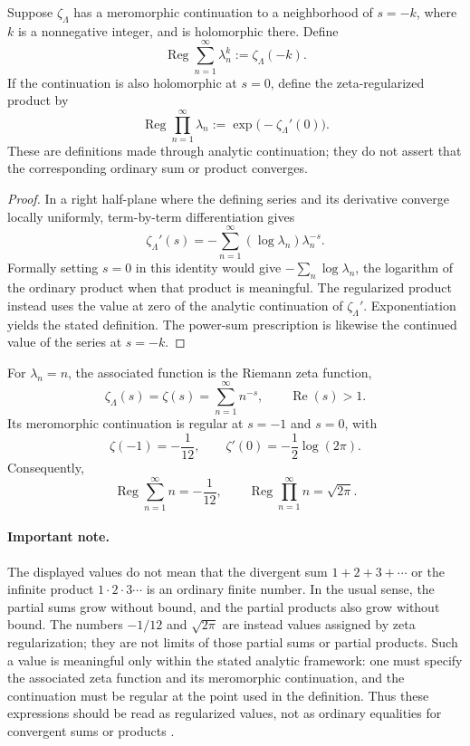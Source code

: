 \begin{theorem}
Suppose $\zeta_\Lambda$ has a meromorphic continuation to a neighborhood of $s=-k$, where $k$ is a nonnegative integer, and is holomorphic there. Define
\[
 \operatorname{Reg}\sum_{n=1}^{\infty}\lambda_n^k:=\zeta_\Lambda(-k).
\]
If the continuation is also holomorphic at $s=0$, define the zeta-regularized product by
\[
 \operatorname{Reg}\prod_{n=1}^{\infty}\lambda_n
 :=\exp\!\bigl(-\zeta_\Lambda'(0)\bigr).
\]
These are definitions made through analytic continuation; they do not assert that the corresponding ordinary sum or product converges.
\end{theorem}

\begin{proof}
In a right half-plane where the defining series and its derivative converge locally uniformly, term-by-term differentiation gives
\[
 \zeta_\Lambda'(s)
 =-\sum_{n=1}^{\infty}(\log\lambda_n)\lambda_n^{-s}.
\]
Formally setting $s=0$ in this identity would give $-\sum_n\log\lambda_n$, the logarithm of the ordinary product when that product is meaningful. The regularized product instead uses the value at zero of the analytic continuation of $\zeta_\Lambda'$. Exponentiation yields the stated definition. The power-sum prescription is likewise the continued value of the series at $s=-k$.
\end{proof}

\begin{example}
For $\lambda_n=n$, the associated function is the Riemann zeta function,
\[
 \zeta_\Lambda(s)=\zeta(s)=\sum_{n=1}^{\infty}n^{-s},
 \qquad \operatorname{Re}(s)>1.
\]
Its meromorphic continuation is regular at $s=-1$ and $s=0$, with
\[
 \zeta(-1)=-\frac{1}{12},
 \qquad
 \zeta'(0)=-\frac12\log(2\pi).
\]
Consequently,
\[
 \operatorname{Reg}\sum_{n=1}^{\infty}n=-\frac{1}{12},
 \qquad
 \operatorname{Reg}\prod_{n=1}^{\infty}n=\sqrt{2\pi}.
\]
\paragraph{Important note.} The displayed values do not mean that the divergent sum $1+2+3+\cdots$ or the infinite product $1\cdot2\cdot3\cdots$ is an ordinary finite number. In the usual sense, the partial sums grow without bound, and the partial products also grow without bound. The numbers $-1/12$ and $\sqrt{2\pi}$ are instead values assigned by zeta regularization; they are not limits of those partial sums or partial products. Such a value is meaningful only within the stated analytic framework: one must specify the associated zeta function and its meromorphic continuation, and the continuation must be regular at the point used in the definition. Thus these expressions should be read as regularized values, not as ordinary equalities for convergent sums or products \cite{SotoVillada2026ZR,Apostol1976-xj}.
\end{example}

